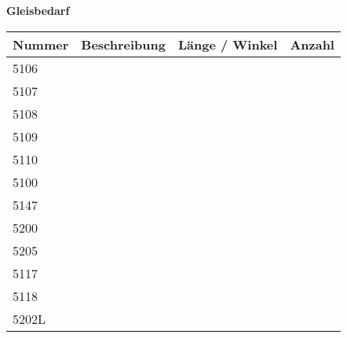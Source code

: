 \documentclass{article}
\begin{document}
\newpage
\makeatletter
\textbf{Gleisbedarf}

\def\GleisAnzahlTab#1{ #1 & \@nameuse{D#1}       & \@nameuse{Dim#1} & \@nameuse{N#1}}
\begin{tabular}{llcr}
  Nummer & Beschreibung & Länge / Winkel & Anzahl \\
  \hline
  \GleisAnzahlTab{5106} \\
  \GleisAnzahlTab{5107} \\
  \GleisAnzahlTab{5108} \\
  \GleisAnzahlTab{5109} \\
  \GleisAnzahlTab{5110} \\
  \GleisAnzahlTab{5100} \\
  \GleisAnzahlTab{5147} \\
  \GleisAnzahlTab{5200} \\
  \GleisAnzahlTab{5205} \\
  \GleisAnzahlTab{5117} \\
  \GleisAnzahlTab{5118} \\
  \GleisAnzahlTab{5202L} \\
  \hline
\end{tabular}
\end{document}
